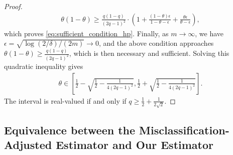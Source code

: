 \begin{proof}
    \begin{align}
        \theta(1-\theta)
        \ge
        \frac{q(1-q)}{(2q-1)^2}\cdot
        \left(
            1
            +
            \frac{(1-\theta)\epsilon}{1-\theta-\epsilon}
            +
            \frac{\theta\epsilon}{\theta-\epsilon}
        \right),
    \end{align}
    which proves \eqref{eq:sufficient_condition_hp}.
    Finally, as $m\to\infty$, we have $\epsilon=\sqrt{\log(2/\delta)/(2m)}\to 0$, and the above condition approaches $\theta(1-\theta)\ge \frac{q(1-q)}{(2q-1)^2}$, which is then necessary and sufficient.
    Solving this quadratic inequality gives
    \begin{align}
        \theta \in
        \left[
            \frac{1}{2}-\sqrt{\frac{1}{2}-\frac{1}{4(2q-1)^2}},
            \frac{1}{2}+\sqrt{\frac{1}{2}-\frac{1}{4(2q-1)^2}}
        \right].
    \end{align}
    The interval is real-valued if and only if
    $q \geq \frac{1}{2}+\frac{1}{2\sqrt{2}}$.
\end{proof}



\subsection{Equivalence between the Misclassification-Adjusted Estimator and Our Estimator}
\label{sec:appendix:equivalence}

